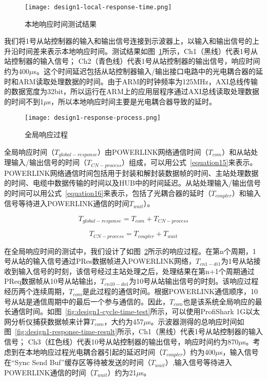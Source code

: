 \begin{figure}[!htb]
  \centering
  \texttt{[image: design1-local-response-time.png]}
  \caption{本地响应时间测试结果}
  \label{fig:design1-local-response-time}
\end{figure}

我们将1号从站控制器的输入和输出信号连接到示波器上，以输入和输出信号的上升沿时间差来表示本地响应时间。测试结果如图~\ref{fig:design1-local-response-time}所示，Ch1（黑线）代表1号从站控制器的输入信号； Ch2（青色线）代表1号从站控制器的输出信号，响应时间约为400$\mu$s。这个时间延迟包括从站控制器输入/输出接口电路中的光电耦合器的延时和ARM读取处理数据的时间。由于ARM的时钟频率为125MHz，AXI总线传输的数据宽度为32bit，所以运行在ARM上的应用层程序通过AXI总线读取处理数据的时间不到1$\mu$s，所以本地响应时间主要是光电耦合器导致的延时。

\begin{figure}[!htb]
  \centering
  \texttt{[image: design1-response-process.png]}
  \caption{全局响应过程}
  \label{fig:design1-response-process}
\end{figure}

全局响应时间（$T_{global-response}$）由POWERLINK网络通信时间（$T_{com}$）和从站处理输入/输出信号的时间（$T_{CN-process}$）组成，可以用公式~\ref{equation15}来表示。POWERLINK网络通信时间包括用于封装和解封装数据帧的时间、主站处理数据的时间、电缆中数据传输的时间以及HUB中的时间延迟。从站处理输入/输出信号的时间可以用公式~\ref{equation16}来表示，包括了光耦合器的延时（$T_{coupler}$）和输入信号等待进入POWERLINK通信的时间$T_{wait}$）。

\begin{equation}
\label{equation15}
T_{global-response}=T_{com}+T_{CN-process}
\end{equation}

\begin{equation}
\label{equation16}
T_{CN-process}=T_{coupler}+T_{wait}
\end{equation}

在全局响应时间的测试中，我们设计了如图~\ref{fig:design1-response-process}所示的响应过程。在第n个周期，1号从站的输入信号通过PRes数据帧进入POWERLINK网络，$T_{cn1-di1}$为1号从站接收到输入信号的时刻，该信号经过主站处理之后，处理结果在第n+1个周期通过PReq数据帧从10号从站输出，$T_{cn10-do1}$为10号从站输出信号的时刻。该响应过程经历两个连续周期，$T_{com}$是此过程的通信时间。根据POWERLINK通信顺序，10号从站是通信周期中的最后一个参与通信的。因此，$T_{com}$也是该系统全局响应的最长通信时间。如图~\ref{fig:design1-cycle-time-test}所示，可以使用ProfiShark 1G以太网分析仪捕获数据帧来计算$T_{com}$，大约为457$\mu$s。示波器测得的总响应时间如图~\ref{fig:design1-response-time-result}所示，Ch1（黑线）代表1号从站控制器的输入信号； Ch3（红色线）代表10号从站控制器的输出信号，响应时间约为870$\mu$s。考虑到在本地响应过程光电耦合器引起的延迟时间（$T_{coupler}$）约为400$\mu$s，输入信号在“Sync Send Buf”缓存区等待被发送的时间（$T_{wait}$）,输入信号等待进入POWERLINK通信的时间（$T_{wait}$）约为21$\mu$s。

